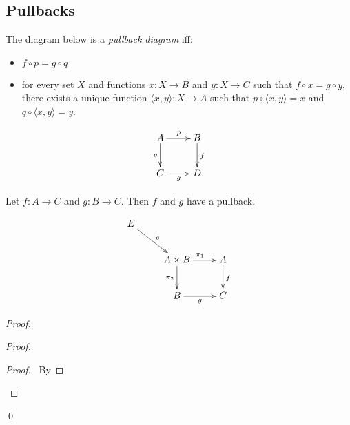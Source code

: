 \subsection{Pullbacks}

  \begin{df}[Pullback]
  The diagram below is a \emph{pullback diagram} iff:
  \begin{itemize}
    \item $f \circ p = g \circ q$
    \item for every set $X$ and
    functions $x : X \rightarrow B$ and $y : X \rightarrow C$ such that $f
    \circ x
    = g \circ y$, there exists a unique function $\langle x, y \rangle : X
    \rightarrow A$ such that $p \circ \langle x,y \rangle = x$ and $q \circ
    \langle
    x, y \rangle = y$.
  \end{itemize}
\[      \xymatrix{ A \ar[r]^p \ar[d]_q & B \ar[d]^f \\
      C \ar[r]_g & D } \]
\end{df}

   \begin{prop}
     \label{prop:sets:axioms:pullback}
 Let $f : A \rightarrow C$ and $g : B \rightarrow C$. Then $f$ and $g$ have a
 pullback.
\end{prop}

   \[ \xymatrix{
  E \ar[dr]^e \\
  & A \times B \ar[r]^{\pi_1} \ar[d]_{\pi_2} & A \ar[d]^f \\
  & B \ar[r]_g & C}
 \]

\begin{proof}
 \pf
 \begin{proof}
   \pf
   \begin{proof}
     \pf\ By 
   \end{proof}
 \end{proof}
 \qed
\end{proof}

